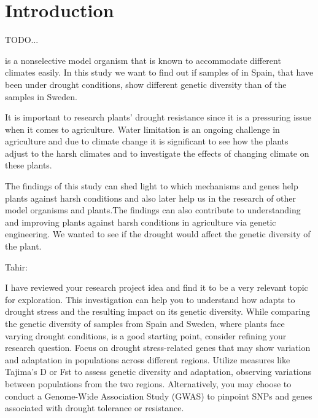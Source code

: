 \section{Introduction}

TODO...

 is a nonselective model organism that is known to accommodate different climates easily. In this study we want to find out if samples of  in Spain, that have been under drought conditions, show different genetic diversity than of the samples in Sweden.

It is important to research plants’ drought resistance since it is a pressuring issue when it comes to agriculture. Water limitation is an ongoing challenge in agriculture and due to climate change it is significant to see how the plants adjust to the harsh climates and to investigate the effects of changing climate on these plants.

The findings of this study can shed light to which mechanisms and genes help plants against harsh conditions and also later help us in the research of other model organisms and plants.The findings can also contribute to understanding and improving plants against harsh conditions in agriculture via genetic engineering. We wanted to see if the drought would affect the genetic diversity of the plant.

Tahir:

I have reviewed your research project idea and find it to be a very relevant topic for exploration. This investigation can help you to understand how  adapts to drought stress and the resulting impact on its genetic diversity. While comparing the genetic diversity of  samples from Spain and Sweden, where plants face varying drought conditions, is a good starting point, consider refining your research question. Focus on drought stress-related genes that may show variation and adaptation in  populations across different regions. Utilize measures like Tajima’s D or Fst to assess genetic diversity and adaptation, observing variations between populations from the two regions. Alternatively, you may choose to conduct a Genome-Wide Association Study (GWAS) to pinpoint SNPs and genes associated with drought tolerance or resistance.